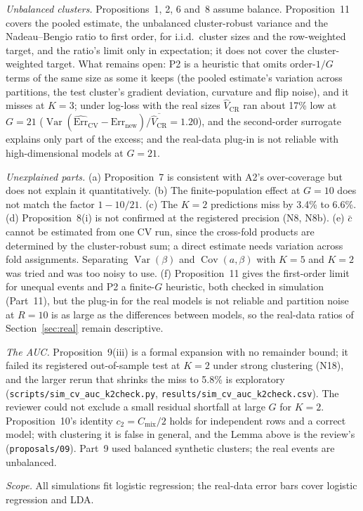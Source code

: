 \documentclass[11pt]{amsart}
\theoremstyle{plain}
\theoremstyle{definition}
\theoremstyle{remark}
\newcommand{\Var}{\operatorname{Var}}
\newcommand{\Cov}{\operatorname{Cov}}
\newcommand{\CV}{\widehat{\mathrm{Err}}_{\mathrm{CV}}}
\newcommand{\Errnew}{\mathrm{Err}_{\mathrm{new}}}
\newcommand{\VCR}{\hat V_{\mathrm{CR}}}
\newcommand{\Cmix}{C_{\mathrm{mix}}}
\begin{document}
\emph{Unbalanced clusters.} Propositions~1, 2, 6 and~8 assume balance. Proposition~11 covers the pooled estimate, the unbalanced cluster-robust variance and the Nadeau--Bengio ratio to first order, for i.i.d.\ cluster sizes and the row-weighted target, and the ratio's limit only in expectation; it does not cover the cluster-weighted target. What remains open: P2 is a heuristic that omits order-$1/G$ terms of the same size as some it keeps (the pooled estimate's variation across partitions, the test cluster's gradient deviation, curvature and flip noise), and it misses at $K=3$; under log-loss with the real sizes $\VCR$ ran about 17\% low at $G=21$ ($\Var(\CV-\Errnew)/\overline{\VCR}=1.20$), and the second-order surrogate explains only part of the excess; and the real-data plug-in is not reliable with high-dimensional models at $G=21$.

\emph{Unexplained parts.} (a) Proposition~7 is consistent with A2's over-coverage but does not explain it quantitatively. (b) The finite-population effect at $G=10$ does not match the factor $1-10/21$. (c) The $K=2$ predictions miss by 3.4\% to 6.6\%. (d) Proposition~8(i) is not confirmed at the registered precision (N8, N8b). (e) $\bar c$ cannot be estimated from one CV run, since the cross-fold products are determined by the cluster-robust sum; a direct estimate needs variation across fold assignments. Separating $\Var(\beta)$ and $\Cov(a,\beta)$ with $K=5$ and $K=2$ was tried and was too noisy to use. (f) Proposition~11 gives the first-order limit for unequal events and P2 a finite-$G$ heuristic, both checked in simulation (Part~11), but the plug-in for the real models is not reliable and partition noise at $R=10$ is as large as the differences between models, so the real-data ratios of Section~\ref{sec:real} remain descriptive.

\emph{The AUC.} Proposition~9(iii) is a formal expansion with no remainder bound; it failed its registered out-of-sample test at $K=2$ under strong clustering (N18), and the larger rerun that shrinks the miss to 5.8\% is exploratory (\texttt{scripts/sim\_cv\_auc\_k2check.py}, \texttt{results/sim\_cv\_auc\_k2check.csv}). The reviewer could not exclude a small residual shortfall at large $G$ for $K=2$. Proposition~10's identity $c_2=\Cmix/2$ holds for independent rows and a correct model; with clustering it is false in general, and the Lemma above is the review's (\texttt{proposals/09}). Part~9 used balanced synthetic clusters; the real events are unbalanced.

\emph{Scope.} All simulations fit logistic regression; the real-data error bars cover logistic regression and LDA.
\end{document}

